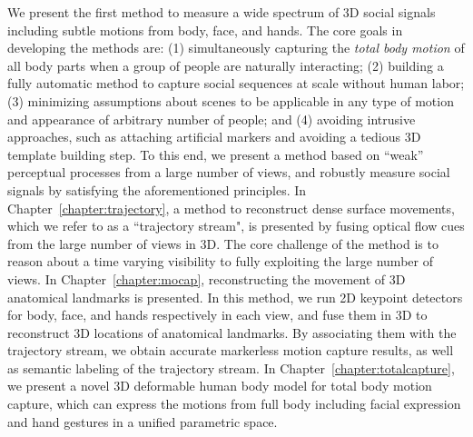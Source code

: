 We present the first method to measure a wide spectrum of 3D social signals including subtle motions from body, face, and hands. The core goals in developing the methods are: (1) simultaneously capturing the \emph{total body motion} of all body parts when a group of people are naturally interacting; (2) building a fully automatic method to capture social sequences at scale without human labor; (3) minimizing assumptions about scenes to be applicable in any type of motion and appearance of arbitrary number of people; and (4) avoiding intrusive approaches, such as attaching artificial markers and avoiding a tedious 3D template building step. To this end, we present a method based on ``weak'' perceptual processes from a large number of views, and robustly measure social signals by satisfying the aforementioned principles. In Chapter~\ref{chapter:trajectory}, a method to reconstruct dense surface movements, which we refer to as a ``trajectory stream", is presented by fusing optical flow cues from the large number of views in 3D. The core challenge of the method is to reason about a time varying visibility to fully exploiting the large number of views. In Chapter~\ref{chapter:mocap}, reconstructing the movement of 3D anatomical landmarks is presented. In this method, we run 2D keypoint detectors for body, face, and hands respectively in each view, and fuse them in 3D to reconstruct 3D locations of anatomical landmarks. By associating them with the trajectory stream, we obtain accurate markerless motion capture results, as well as semantic labeling of the trajectory stream.  In Chapter~\ref{chapter:totalcapture}, we present a novel 3D deformable human body model for total body motion capture, which can express the motions from full body including facial expression and hand gestures in a unified parametric space. 


	



